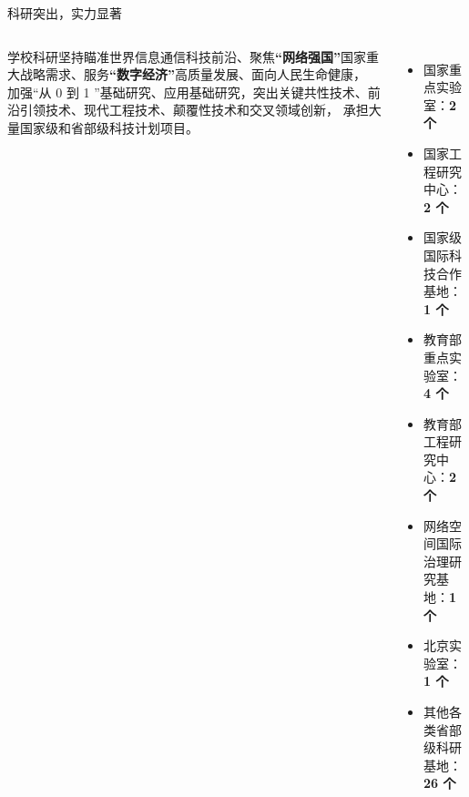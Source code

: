 \documentclass[aspectratio=169, utf8, fontset=windows]{beamer}
\begin{document}
\begin{frame}{科研突出，实力显著}
    \begin{columns}
        \setlength{\parindent}{2em}

        学校科研坚持瞄准世界信息通信科技前沿、聚焦\textcolor{Fore}{\textbf{“网络强国”}}国家重大战略需求、服务\textcolor{Fore}{\textbf{“数字经济”}}高质量发展、面向人民生命健康，
        加强“从 0 到 1 ”基础研究、应用基础研究，突出关键共性技术、前沿引领技术、现代工程技术、颠覆性技术和交叉领域创新，
        承担大量国家级和省部级科技计划项目。

        \begin{itemize}
            \item 国家重点实验室：\textcolor{Fore}{\textbf{2 个}}
            \item 国家工程研究中心：\textcolor{Fore}{\textbf{2 个}}
            \item 国家级国际科技合作基地：\textcolor{Fore}{\textbf{1 个}}
            \item 教育部重点实验室：\textcolor{Fore}{\textbf{4 个}}
            \item 教育部工程研究中心：\textcolor{Fore}{\textbf{2 个}}
            \item 网络空间国际治理研究基地：\textcolor{Fore}{\textbf{1 个}}
            \item 北京实验室：\textcolor{Fore}{\textbf{1 个}}
            \item 其他各类省部级科研基地：\textcolor{Fore}{\textbf{26 个}}
        \end{itemize}
    \end{columns}
\end{frame}
\end{document}
